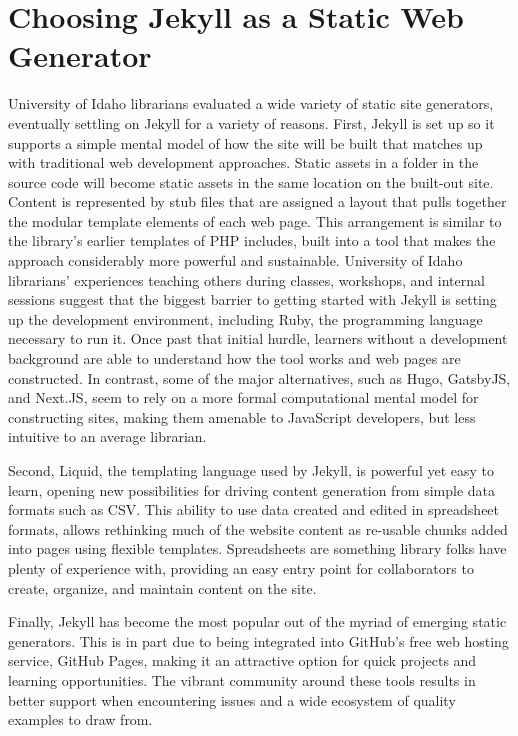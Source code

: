 \documentclass{book}
\begin{document}
\hypertarget{choosing-jekyll-as-a-static-web-generator}{%
\section{Choosing Jekyll as a Static Web
Generator}\label{choosing-jekyll-as-a-static-web-generator}}

University of Idaho librarians evaluated a wide variety of static site
generators, eventually settling on Jekyll for a variety of reasons. First,
Jekyll is set up so it supports a simple mental model of how the site will be
built that matches up with traditional web development approaches. Static
assets in a folder in the source code will become static assets in the same
location on the built-out site. Content is represented by stub files that are
assigned a layout that pulls together the modular template elements of each
web page. This arrangement is similar to the library's earlier templates of
PHP includes, built into a tool that makes the approach considerably more
powerful and sustainable. University of Idaho librarians' experiences teaching
others during classes, workshops, and internal sessions suggest that the
biggest barrier to getting started with Jekyll is setting up the development
environment, including Ruby, the programming language necessary to run it.
Once past that initial hurdle, learners without a development background are
able to understand how the tool works and web pages are constructed. In
contrast, some of the major alternatives, such as Hugo, GatsbyJS, and Next.JS,
seem to rely on a more formal computational mental model for constructing
sites, making them amenable to JavaScript developers, but less intuitive to an
average librarian.

Second, Liquid, the templating language used by Jekyll, is powerful yet easy
to learn, opening new possibilities for driving content generation from simple
data formats such as CSV. This ability to use data created and edited in
spreadsheet formats, allows rethinking much of the website content as
re-usable chunks added into pages using flexible templates. Spreadsheets are
something library folks have plenty of experience with, providing an easy
entry point for collaborators to create, organize, and maintain content on the
site.

Finally, Jekyll has become the most popular out of the myriad of emerging
static generators. This is in part due to being integrated into GitHub's free
web hosting service, GitHub Pages, making it an attractive option for quick
projects and learning opportunities. The vibrant community around these tools
results in better support when encountering issues and a wide ecosystem of
quality examples to draw from.
\end{document}
